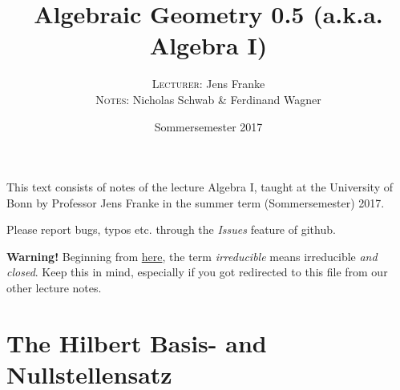 \documentclass[a4paper,parskip=half,numbers=enddot, DIV=12]{scrreprt}
\title{Algebraic Geometry 0.5 (a.k.a. Algebra I)}
\author{\textsc{Lecturer:} Jens Franke\\
	\textsc{Notes:} Nicholas Schwab \& Ferdinand Wagner}
\date{Sommersemester 2017}
\begin{document}
	\maketitle
	
	\thispagestyle{plain}
	This text consists of notes of the lecture Algebra I, taught at the University of Bonn by Professor Jens Franke in the summer term (Sommersemester) 2017. 
	
	Please report bugs, typos etc. through the \emph{Issues} feature of github.
	
	\textbf{Warning!} Beginning from \hyperref[rem:irreducibleNotation]{here}, the term \emph{irreducible} means irreducible \emph{and closed}. Keep this in mind, especially if you got redirected to this file from our other lecture notes.
	
	\tableofcontents
	
	
	\chapter{The Hilbert Basis- and Nullstellensatz}
\end{document}
